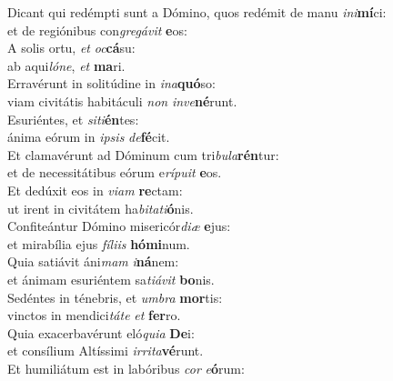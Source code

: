 \evenverse Dicant qui redémpti sunt a Dómino, quos redémit de manu \textit{i}\textit{ni}\textbf{mí}ci:~\*\\
\evenverse et de regiónibus con\textit{gre}\textit{gá}\textit{vit} \textbf{e}os:\\
\oddverse A solis ortu, \textit{et} \textit{oc}\textbf{cá}su:~\*\\
\oddverse ab aqui\textit{ló}\textit{ne}, \textit{et} \textbf{ma}ri.\\
\evenverse Erravérunt in solitúdine in \textit{i}\textit{na}\textbf{quó}so:~\*\\
\evenverse viam civitátis habitáculi \textit{non} \textit{in}\textit{ve}\textbf{né}runt.\\
\oddverse Esuriéntes, et \textit{si}\textit{ti}\textbf{én}tes:~\*\\
\oddverse ánima eórum in \textit{i}\textit{psis} \textit{de}\textbf{fé}cit.\\
\evenverse Et clamavérunt ad Dóminum cum tri\textit{bu}\textit{la}\textbf{rén}tur:~\*\\
\evenverse et de necessitátibus eórum e\textit{rí}\textit{pu}\textit{it} \textbf{e}os.\\
\oddverse Et dedúxit eos in \textit{vi}\textit{am} \textbf{re}ctam:~\*\\
\oddverse ut irent in civitátem ha\textit{bi}\textit{ta}\textit{ti}\textbf{ó}nis.\\
\evenverse Confiteántur Dómino misericór\textit{di}\textit{æ} \textbf{e}jus:~\*\\
\evenverse et mirabília ejus \textit{fí}\textit{li}\textit{is} \textbf{hó}\textbf{mi}num.\\
\oddverse Quia satiávit áni\textit{mam} \textit{i}\textbf{ná}nem:~\*\\
\oddverse et ánimam esuriéntem sa\textit{ti}\textit{á}\textit{vit} \textbf{bo}nis.\\
\evenverse Sedéntes in ténebris, et \textit{um}\textit{bra} \textbf{mor}tis:~\*\\
\evenverse vinctos in mendici\textit{tá}\textit{te} \textit{et} \textbf{fer}ro.\\
\oddverse Quia exacerbavérunt eló\textit{qui}\textit{a} \textbf{De}i:~\*\\
\oddverse et consílium Altíssimi \textit{ir}\textit{ri}\textit{ta}\textbf{vé}runt.\\
\evenverse Et humiliátum est in labóribus \textit{cor} \textit{e}\textbf{ó}rum:~\*\\
